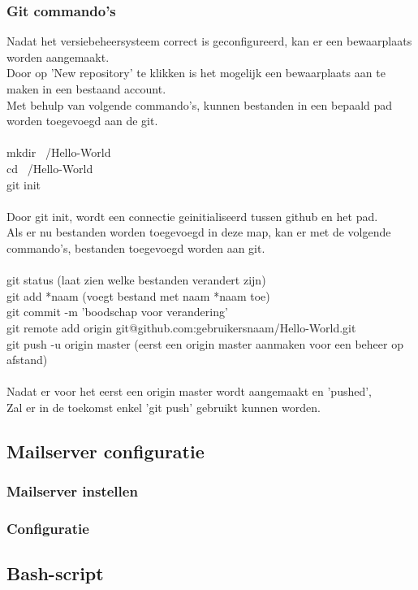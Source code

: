 \documentclass[12pt]{article}
\begin{document}
				\subsubsection{Git commando's}
					Nadat het versiebeheersysteem correct is geconfigureerd, kan er een bewaarplaats worden aangemaakt.\\
					Door op 'New repository' te klikken is het mogelijk een bewaarplaats aan te maken in een bestaand account.\\
					Met behulp van volgende commando's, kunnen bestanden in een bepaald pad worden toegevoegd aan de git.\\
					\\
					 mkdir ~/Hello-World\\
					 cd ~/Hello-World\\
					 git init\\
					 \\
					 Door git init, wordt een connectie geinitialiseerd tussen github en het pad.\\
					 Als er nu bestanden worden toegevoegd in deze map, kan er met de volgende commando's, bestanden toegevoegd worden aan git.\\
					 \\
					  git status (laat zien welke bestanden verandert zijn)\\
					  git add *naam (voegt bestand met naam *naam toe)\\
					  git commit -m 'boodschap voor verandering'\\
					  git remote add origin git@github.com:gebruikersnaam/Hello-World.git\\
					  git push -u origin master (eerst een origin master aanmaken voor een beheer op afstand)\\
					  \\
					  Nadat er voor het eerst een origin master wordt aangemaakt en 'pushed',\\
					  Zal er in de toekomst enkel 'git push' gebruikt kunnen worden.
					
			\subsection{Mailserver configuratie}\label{Mail}
				\subsubsection{Mailserver instellen}
					
					
				\subsubsection{Configuratie}
					
					
			\subsection{Bash-script}\label{Script}
			

		\newpage
		
		\newpage
		\printindex \label{Index}			
\end{document}
